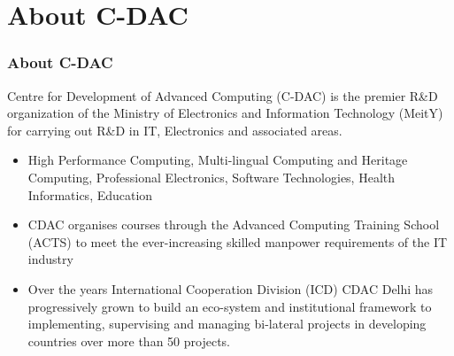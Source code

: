 \section{About C-DAC}

\begin{frame}
\frametitle{About C-DAC}
Centre for Development of Advanced Computing (C-DAC) is the premier R\&D organization of the Ministry of Electronics and Information Technology (MeitY) for carrying out R\&D in IT, Electronics and associated areas.
 \vspace{.4cm}
\begin{itemize}
    \item<1-> High Performance Computing, Multi-lingual Computing and Heritage Computing, Professional Electronics, Software Technologies, Health Informatics, Education
    \item<2-> CDAC organises courses  through the Advanced Computing Training School (ACTS) to meet the ever-increasing skilled manpower requirements of the IT industry
    \item<3-> Over the years International Cooperation Division (ICD) CDAC Delhi has progressively grown to build an eco-system and institutional framework to implementing, supervising and managing  bi-lateral projects in developing countries over more than 50 projects.
\end{itemize}

\end{frame}